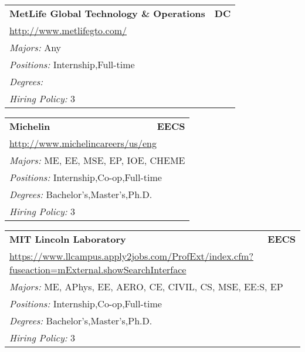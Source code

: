\documentclass[twoside]{article}
\begin{document}
\begin{center}
\begin{multicols}{3}
\begin{FlushLeft}
\begin{minipage}{.9\columnwidth}
\end{minipage}
 
\begin{minipage}{.9\columnwidth}\begin{tabularx}{.95\columnwidth}{Xr}
                 {\Large\bf MetLife Global Technology \& Operations} & {\Large\bf DC}\\
    \multicolumn{2}{p{.95\columnwidth}}{\url{http://www.metlifegto.com/}}\\
    \multicolumn{2}{p{.95\columnwidth}}{\emph{Majors:} Any}\\
    \multicolumn{2}{p{.95\columnwidth}}{\emph{Positions:} Internship,Full-time}\\
    \multicolumn{2}{p{.95\columnwidth}}{\emph{Degrees:} }\\
    \multicolumn{2}{p{.95\columnwidth}}{\emph{Hiring Policy:} 3}\\
    \end{tabularx}
    
\end{minipage}
 
\begin{minipage}{.9\columnwidth}\begin{tabularx}{.95\columnwidth}{Xr}
                 {\Large\bf Michelin} & {\Large\bf EECS}\\
    \multicolumn{2}{p{.95\columnwidth}}{\url{http://www.michelincareers/us/eng}}\\
    \multicolumn{2}{p{.95\columnwidth}}{\emph{Majors:} ME, EE, MSE, EP, IOE, CHEME}\\
    \multicolumn{2}{p{.95\columnwidth}}{\emph{Positions:} Internship,Co-op,Full-time}\\
    \multicolumn{2}{p{.95\columnwidth}}{\emph{Degrees:} Bachelor's,Master's,Ph.D.}\\
    \multicolumn{2}{p{.95\columnwidth}}{\emph{Hiring Policy:} 3}\\
    \end{tabularx}
    
\end{minipage}
 
\begin{minipage}{.9\columnwidth}\begin{tabularx}{.95\columnwidth}{Xr}
                 {\Large\bf MIT Lincoln Laboratory} & {\Large\bf EECS}\\
    \multicolumn{2}{p{.95\columnwidth}}{\url{https://www.llcampus.apply2jobs.com/ProfExt/index.cfm?fuseaction=mExternal.showSearchInterface}}\\
    \multicolumn{2}{p{.95\columnwidth}}{\emph{Majors:} ME, APhys, EE, AERO, CE, CIVIL, CS, MSE, EE:S, EP}\\
    \multicolumn{2}{p{.95\columnwidth}}{\emph{Positions:} Internship,Co-op,Full-time}\\
    \multicolumn{2}{p{.95\columnwidth}}{\emph{Degrees:} Bachelor's,Master's,Ph.D.}\\
    \multicolumn{2}{p{.95\columnwidth}}{\emph{Hiring Policy:} 3}\\
    \end{tabularx}
    

\end{minipage}
\end{FlushLeft}
\end{multicols}
\end{center}
\end{document}
